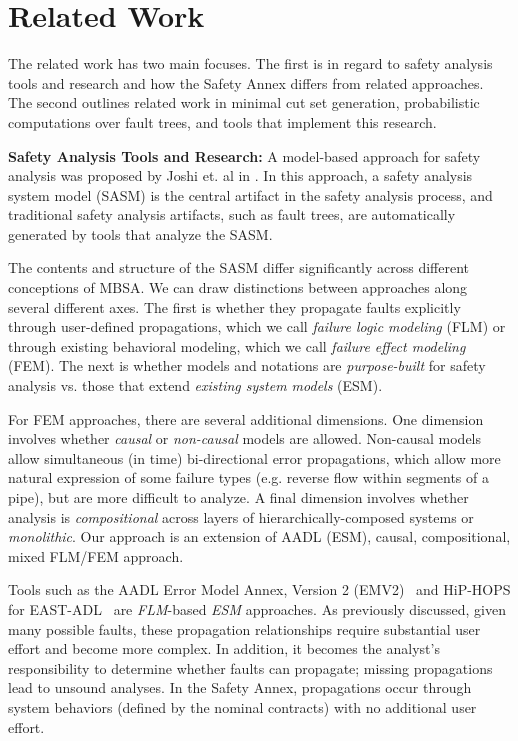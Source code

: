 \section{Related Work}
The related work has two main focuses. The first is in regard to safety analysis tools and research and how the Safety Annex differs from related approaches. The second outlines related work in minimal cut set generation, probabilistic computations over fault trees, and tools that implement this research. 

\textbf{Safety Analysis Tools and Research:}
A model-based approach for safety analysis was proposed by Joshi et. al in \cite{Joshi05:Dasc, Joshi05:SafeComp, Joshi07:Hase}.  In this approach, a safety analysis system model (SASM) is the central artifact in the safety analysis process, and traditional safety analysis artifacts, such as fault trees, are automatically generated by tools that analyze the SASM.

The contents and structure of the SASM differ significantly across different conceptions of MBSA.  We can draw distinctions between approaches along several different axes.  The first is whether they propagate faults explicitly through user-defined propagations, which we call {\em failure logic modeling} (FLM) or through existing behavioral modeling, which we call {\em failure effect modeling} (FEM).  The next is whether models and notations are {\em purpose-built} for safety analysis vs. those that extend {\em existing system models} (ESM).

For FEM approaches, there are several additional dimensions.  One dimension involves whether {\em causal} or {\em non-causal} models are allowed.  Non-causal models allow simultaneous (in time) bi-directional %
error propagations, which allow more natural expression of some failure types (e.g. reverse flow within segments of a pipe), but are more difficult to analyze.  A final dimension involves whether analysis is {\em compositional} across layers of hierarchically-composed systems or {\em monolithic}.  Our approach is an extension of AADL (ESM), causal, compositional, mixed FLM/FEM approach.

Tools such as the AADL Error Model Annex, Version 2 (EMV2)~\cite{EMV2} and HiP-HOPS for EAST-ADL~\cite{CHEN201391} are {\em FLM}-based {\em ESM} approaches.  As previously discussed, given many possible faults, these propagation relationships require substantial user effort and become more complex.  In addition, it becomes the analyst's responsibility to determine whether faults can propagate; missing propagations lead to unsound analyses.  In the Safety Annex, propagations occur through system behaviors (defined by the nominal contracts) with no additional user effort.


